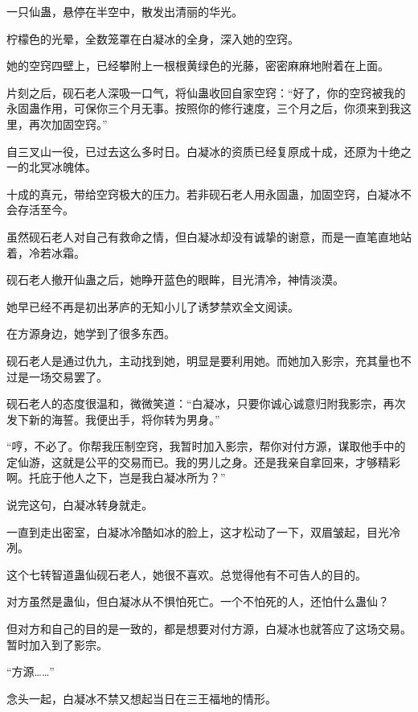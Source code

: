 
\begin{this_body}



一只仙蛊，悬停在半空中，散发出清丽的华光。

柠檬色的光晕，全数笼罩在白凝冰的全身，深入她的空窍。

她的空窍四壁上，已经攀附上一根根黄绿色的光藤，密密麻麻地附着在上面。

片刻之后，砚石老人深吸一口气，将仙蛊收回自家空窍：“好了，你的空窍被我的永固蛊作用，可保你三个月无事。按照你的修行速度，三个月之后，你须来到我这里，再次加固空窍。”

自三叉山一役，已过去这么多时日。白凝冰的资质已经复原成十成，还原为十绝之一的北冥冰魄体。

十成的真元，带给空窍极大的压力。若非砚石老人用永固蛊，加固空窍，白凝冰不会存活至今。

虽然砚石老人对自己有救命之情，但白凝冰却没有诚挚的谢意，而是一直笔直地站着，冷若冰霜。

砚石老人撤开仙蛊之后，她睁开蓝色的眼眸，目光清冷，神情淡漠。

她早已经不再是初出茅庐的无知小儿了诱梦禁欢全文阅读。

在方源身边，她学到了很多东西。

砚石老人是通过仇九，主动找到她，明显是要利用她。而她加入影宗，充其量也不过是一场交易罢了。

砚石老人的态度很温和，微微笑道：“白凝冰，只要你诚心诚意归附我影宗，再次发下新的海誓。我便出手，将你转为男身。”

“哼，不必了。你帮我压制空窍，我暂时加入影宗，帮你对付方源，谋取他手中的定仙游，这就是公平的交易而已。我的男儿之身。还是我亲自拿回来，才够精彩啊。托庇于他人之下，岂是我白凝冰所为？”

说完这句，白凝冰转身就走。

一直到走出密室，白凝冰冷酷如冰的脸上，这才松动了一下，双眉皱起，目光冷冽。

这个七转智道蛊仙砚石老人，她很不喜欢。总觉得他有不可告人的目的。

对方虽然是蛊仙，但白凝冰从不惧怕死亡。一个不怕死的人，还怕什么蛊仙？

但对方和自己的目的是一致的，都是想要对付方源，白凝冰也就答应了这场交易。暂时加入到了影宗。

“方源……”

念头一起，白凝冰不禁又想起当日在三王福地的情形。


\end{this_body}

